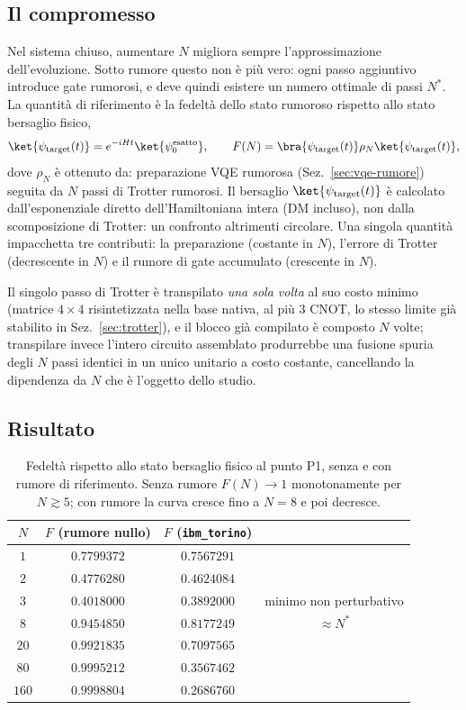 \documentclass[11pt,a4paper]{article}
\begin{document}
\subsection{Il compromesso}

Nel sistema chiuso, aumentare $N$ migliora sempre l'approssimazione
dell'evoluzione. Sotto rumore questo non è più vero: ogni passo aggiuntivo
introduce gate rumorosi, e deve quindi esistere un numero ottimale di
passi $N^*$. La quantità di riferimento è la fedeltà dello stato rumoroso
rispetto allo stato bersaglio fisico,
\begin{equation}
\ket{\psi_{\rm target}(t)} = e^{-iHt}\ket{\psi_0^{\rm esatto}}, \qquad
F(N) = \bra{\psi_{\rm target}(t)}\rho_N\ket{\psi_{\rm target}(t)},
\label{eq:F-N}
\end{equation}
dove $\rho_N$ è ottenuto da: preparazione VQE rumorosa (Sez.~\ref{sec:vqe-rumore})
seguita da $N$ passi di Trotter rumorosi. Il bersaglio
$\ket{\psi_{\rm target}(t)}$ è calcolato dall'esponenziale diretto
dell'Hamiltoniana intera (DM incluso), non dalla scomposizione di Trotter:
un confronto altrimenti circolare. Una singola quantità impacchetta tre
contributi: la preparazione (costante in $N$), l'errore di Trotter
(decrescente in $N$) e il rumore di gate accumulato (crescente in $N$).

Il singolo passo di Trotter è transpilato \emph{una sola volta} al suo
costo minimo (matrice $4\times4$ risintetizzata nella base nativa, al più
$3$ CNOT, lo stesso limite già stabilito in Sez.~\ref{sec:trotter}), e il
blocco già compilato è composto $N$ volte; transpilare invece l'intero
circuito assemblato produrrebbe una fusione spuria degli $N$ passi
identici in un unico unitario a costo costante, cancellando la dipendenza
da $N$ che è l'oggetto dello studio.

\subsection{Risultato}

\begin{table}[htbp]
\centering
\renewcommand{\arraystretch}{1.15}
\small
\begin{tabular}{@{}cccc@{}}
\toprule
$N$ & $F$ (rumore nullo) & $F$ (\texttt{ibm\_torino}) & \\
\midrule
$1$ & $0.7799372$ & $0.7567291$ & \\
$2$ & $0.4776280$ & $0.4624084$ & \\
$3$ & $0.4018000$ & $0.3892000$ & minimo non perturbativo\\
$8$ & $0.9454850$ & $0.8177249$ & $\approx N^*$\\
$20$ & $0.9921835$ & $0.7097565$ & \\
$80$ & $0.9995212$ & $0.3567462$ & \\
$160$ & $0.9998804$ & $0.2686760$ & \\
\bottomrule
\end{tabular}
\caption{Fedeltà rispetto allo stato bersaglio fisico al punto P1, senza
e con rumore di riferimento. Senza rumore $F(N)\to1$ monotonamente per
$N\gtrsim5$; con rumore la curva cresce fino a $N=8$ e poi decresce.}
\label{tab:F-N}
\end{table}
\end{document}
